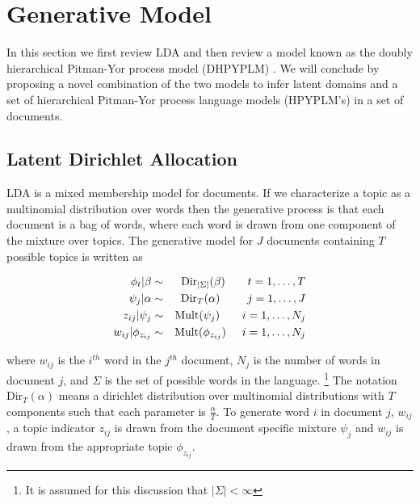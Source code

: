 \section{Generative Model}

\newcommand{\G}{\mathcal{G}}
\newcommand{\LM}{\mathcal{L}\mathcal{M}}
\newcommand{\bu}{{\bf u}}
\newcommand{\PY}{\mathcal{P}\mathcal{Y}}
\newcommand{\D}{\mathcal{D}}
\newcommand{\LA}{\mathcal{L}}

In this section we first review LDA and then review a model known as the doubly hierarchical Pitman-Yor process model (DHPYPLM) \cite{Wood2009a}. We will conclude by proposing a novel combination of the two models to infer latent domains and a set of hierarchical Pitman-Yor process language models (HPYPLM's) \cite{Teh2006a} in a set of documents.

\subsection{Latent Dirichlet Allocation}

LDA \cite{Blei2003} is a mixed membership model for documents.  If we characterize a topic as a multinomial distribution over words then the generative process is that each document is a bag of words, where each word is drawn from one component of the mixture over topics. The generative model for $J$ documents containing $T$ possible topics is written as 

\begin{eqnarray}
\phi_t | \beta  &\sim& \textrm{Dir}_{|\Sigma|}(\beta)  \hspace{.7cm} t = 1,\ldots,T \nonumber \\
\psi_j | \alpha &\sim& \textrm{Dir}_T(\alpha) \hspace{.85cm} j = 1,\ldots, J\nonumber \\
z_{ij} | \psi_j &\sim& \textrm{Mult}(\psi_j) \hspace{.7cm} i = 1,\ldots, N_j \nonumber \\
w_{ij} | \phi_{z_{ij}} &\sim& \textrm{Mult}(\phi_{z_{ij}}) \hspace{.5cm} i = 1,\ldots, N_j 
\end{eqnarray}

\noindent where $w_{ij}$ is the $i^{th}$ word in the $j^{th}$ document, $N_j$ is the number of words in document $j$, and $\Sigma$ is the set of possible words in the language. \footnote{It is assumed for this discussion that $| \Sigma| < \infty$} The notation $\textrm{Dir}_T(\alpha)$ means a dirichlet distribution over multinomial distributions with $T$ components such that each parameter is $\frac{\alpha}{T}$.  To generate word $i$ in document $j$, $w_{ij}$, a topic indicator $z_{ij}$ is drawn from the document specific mixture $\psi_j$ and $w_{ij}$ is drawn from the appropriate topic $\phi_{z_{ij}}$. 

